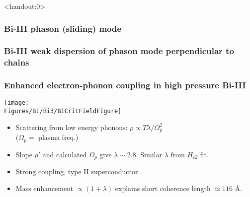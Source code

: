 \begin{frame}<handout:0>
  \frametitle{Bi-III phason (sliding) mode}
  \centerline{}
  \end{frame}
  

\begin{frame}
\frametitle{Bi-III weak dispersion of phason mode perpendicular to chains}
\centerline{}

\end{frame}

\begin{frame}[label=BiSuper2]
  \frametitle{Enhanced electron-phonon coupling in high pressure Bi-III}
  
  \centerline{\texttt{[image: \\Figures/Bi/Bi3/BiCritFieldFigure]}}
  
  \begin{itemize}
  \item Scattering from low energy phonons:
  $\rho \propto T \lambda/\Omega_p^2$\\
  ($\Omega_p = $ plasma freq.)
  
  \item Slope $\rho'$ and calculated $\Omega_p$ give
    $\lambda\sim 2.8$. Similar $\lambda$ from $H_{c2}$ fit.
  \item Strong coupling, type II superconductor. 
  \item Mass enhancement $\propto (1+\lambda)$
    explains short coherence length $\simeq 116$ \AA.
  \end{itemize}
  \end{frame}

